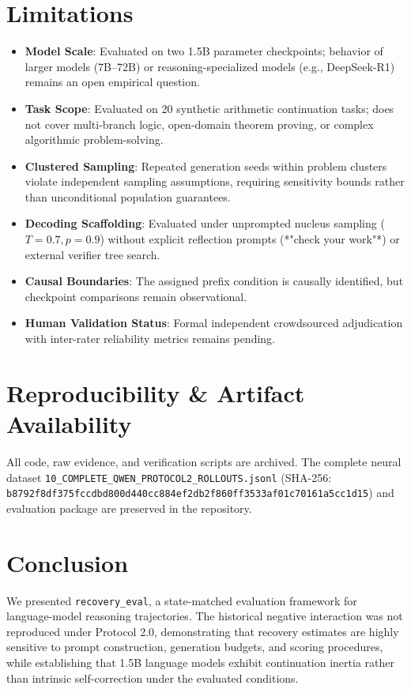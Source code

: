 \documentclass[10pt,conference]{IEEEtran}
\begin{document}
\section{Limitations}
\begin{itemize}
    \item \textbf{Model Scale}: Evaluated on two 1.5B parameter checkpoints; behavior of larger models (7B--72B) or reasoning-specialized models (e.g., DeepSeek-R1) remains an open empirical question.
    \item \textbf{Task Scope}: Evaluated on 20 synthetic arithmetic continuation tasks; does not cover multi-branch logic, open-domain theorem proving, or complex algorithmic problem-solving.
    \item \textbf{Clustered Sampling}: Repeated generation seeds within problem clusters violate independent sampling assumptions, requiring sensitivity bounds rather than unconditional population guarantees.
    \item \textbf{Decoding Scaffolding}: Evaluated under unprompted nucleus sampling ($T=0.7, p=0.9$) without explicit reflection prompts (*"check your work"*) or external verifier tree search.
    \item \textbf{Causal Boundaries}: The assigned prefix condition is causally identified, but checkpoint comparisons remain observational.
    \item \textbf{Human Validation Status}: Formal independent crowdsourced adjudication with inter-rater reliability metrics remains pending.
\end{itemize}

\section{Reproducibility \& Artifact Availability}
All code, raw evidence, and verification scripts are archived. The complete neural dataset \texttt{10\_COMPLETE\_QWEN\_PROTOCOL2\_ROLLOUTS.jsonl} (SHA-256: \texttt{b8792f8df375fccdbd800d440cc884ef\allowbreak 2db2f860ff3533af01c70161a5cc1d15}) and evaluation package are preserved in the repository.

\section{Conclusion}
We presented \texttt{recovery\_eval}, a state-matched evaluation framework for language-model reasoning trajectories. The historical negative interaction was not reproduced under Protocol 2.0, demonstrating that recovery estimates are highly sensitive to prompt construction, generation budgets, and scoring procedures, while establishing that 1.5B language models exhibit continuation inertia rather than intrinsic self-correction under the evaluated conditions.

\balance


\end{document}
